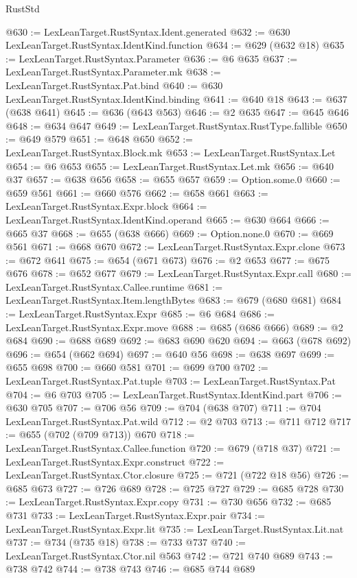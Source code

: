 \begin{lexlean}{RustStd}
\begin{coremodule}
{\begin{coremodule}
{{{{{{{{{{{{{{{@630 := LexLeanTarget.RustSyntax.Ident.generated
@632 := @630 LexLeanTarget.RustSyntax.IdentKind.function
@634 := @629 (@632 @18)
@635 := LexLeanTarget.RustSyntax.Parameter
@636 := @6 @635
@637 := LexLeanTarget.RustSyntax.Parameter.mk
@638 := LexLeanTarget.RustSyntax.Pat.bind
@640 := @630 LexLeanTarget.RustSyntax.IdentKind.binding
@641 := @640 @18
@643 := @637 (@638 @641)
@645 := @636 (@643 @563)
@646 := @2 @635
@647 := @645 @646
@648 := @634 @647
@649 := LexLeanTarget.RustSyntax.RustType.fallible
@650 := @649 @579
@651 := @648 @650
@652 := LexLeanTarget.RustSyntax.Block.mk
@653 := LexLeanTarget.RustSyntax.Let
@654 := @6 @653
@655 := LexLeanTarget.RustSyntax.Let.mk
@656 := @640 @37
@657 := @638 @656
@658 := @655 @657
@659 := Option.some.{0}
@660 := @659 @561
@661 := @660 @576
@662 := @658 @661
@663 := LexLeanTarget.RustSyntax.Expr.block
@664 := LexLeanTarget.RustSyntax.IdentKind.operand
@665 := @630 @664
@666 := @665 @37
@668 := @655 (@638 @666)
@669 := Option.none.{0}
@670 := @669 @561
@671 := @668 @670
@672 := LexLeanTarget.RustSyntax.Expr.clone
@673 := @672 @641
@675 := @654 (@671 @673)
@676 := @2 @653
@677 := @675 @676
@678 := @652 @677
@679 := LexLeanTarget.RustSyntax.Expr.call
@680 := LexLeanTarget.RustSyntax.Callee.runtime
@681 := LexLeanTarget.RustSyntax.Item.lengthBytes
@683 := @679 (@680 @681)
@684 := LexLeanTarget.RustSyntax.Expr
@685 := @6 @684
@686 := LexLeanTarget.RustSyntax.Expr.move
@688 := @685 (@686 @666)
@689 := @2 @684
@690 := @688 @689
@692 := @683 @690 @620
@694 := @663 (@678 @692)
@696 := @654 (@662 @694)
@697 := @640 @56
@698 := @638 @697
@699 := @655 @698
@700 := @660 @581
@701 := @699 @700
@702 := LexLeanTarget.RustSyntax.Pat.tuple
@703 := LexLeanTarget.RustSyntax.Pat
@704 := @6 @703
@705 := LexLeanTarget.RustSyntax.IdentKind.part
@706 := @630 @705
@707 := @706 @56
@709 := @704 (@638 @707)
@711 := @704 LexLeanTarget.RustSyntax.Pat.wild
@712 := @2 @703
@713 := @711 @712
@717 := @655 (@702 (@709 @713)) @670
@718 := LexLeanTarget.RustSyntax.Callee.function
@720 := @679 (@718 @37)
@721 := LexLeanTarget.RustSyntax.Expr.construct
@722 := LexLeanTarget.RustSyntax.Ctor.closure
@725 := @721 (@722 @18 @56)
@726 := @685 @673
@727 := @726 @689
@728 := @725 @727
@729 := @685 @728
@730 := LexLeanTarget.RustSyntax.Expr.copy
@731 := @730 @656
@732 := @685 @731
@733 := LexLeanTarget.RustSyntax.Expr.pair
@734 := LexLeanTarget.RustSyntax.Expr.lit
@735 := LexLeanTarget.RustSyntax.Lit.nat
@737 := @734 (@735 @18)
@738 := @733 @737
@740 := LexLeanTarget.RustSyntax.Ctor.nil @563
@742 := @721 @740 @689
@743 := @738 @742
@744 := @738 @743
@746 := @685 @744 @689
}}}}}}}}}}}}}}}
\end{coremodule}}
\end{coremodule}
\end{lexlean}
